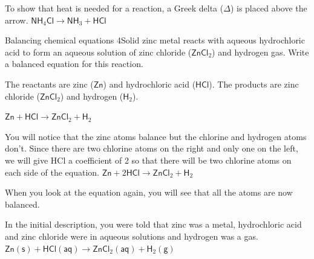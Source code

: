 \label{m38727*eip-536}To show that heat is needed for a reaction, a Greek delta ($\Delta $) is placed above the arrow.
$\mathsf{NH}_{4}\mathsf{Cl} \rightarrow \mathsf{NH}_{3} + \mathsf{HCl}$ 
	\par
\label{m38727*secfhsst!!!underscore!!!id967}\vspace{.5cm} 
      \noindent
\begin{wex}{Balancing chemical equations 4}{Solid zinc metal reacts with aqueous hydrochloric acid to form an aqueous solution of zinc chloride ($\mathsf{ZnCl}_{2}$) and hydrogen gas. Write a balanced equation for this reaction.}

{
The reactants are zinc ($\mathsf{Zn}$) and hydrochloric acid ($\mathsf{HCl}$). The products are zinc chloride ($\mathsf{ZnCl}_{2}$) and hydrogen ($\mathsf{H}_{2}$).\\
}

{
${\mathsf{Zn} + \mathsf{HCl} \rightarrow \mathsf{ZnCl}_{2} + \mathsf{H}_{2}}$
}

{
You will notice that the zinc atoms balance but the chlorine and hydrogen atoms don't. Since there are two chlorine atoms on the right and only one on the left, we will give HCl a coefficient of 2 so that there will be two chlorine atoms on each side of the equation.
${\mathsf{Zn} + 2\mathsf{HCl} \rightarrow \mathsf{ZnCl}_{2} + \mathsf{H}_{2}}$
}

{
When you look at the equation again, you will see that all the atoms are now balanced.
}

{
In the initial description, you were told that zinc was a metal, hydrochloric acid and zinc chloride were in aqueous solutions and hydrogen was a gas.
$\mathsf{Zn (s)} + \mathsf{HCl (aq)} \rightarrow \mathsf{ZnCl}_{2} \mathsf{(aq)} + \mathsf{H}_{2} \mathsf{(g)}$
}
\end{wex}
    \noindent
\par

